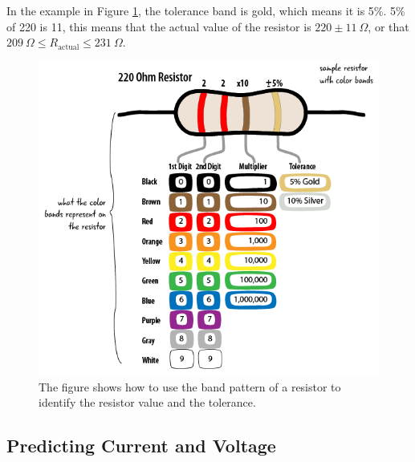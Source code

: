 \documentclass[12pt]{article}
\begin{document}
	In the example in Figure \ref{resistor-chart}, the tolerance band is gold, which means it is 5\%. 5\% of 220 is 11, this means that the actual value of the resistor is $220\pm 11\ \Omega$, or that $209\ \Omega\leq R_\mathrm{actual}\leq 231\ \Omega$.
	\begin{figure}[htb!]
		\centering
		\includegraphics[width=.7\textwidth]{app-a-resistor-chart.png}
		\caption{The figure shows how to use the band pattern of a resistor to identify the resistor value and the tolerance.}
		\label{resistor-chart}
	\end{figure}
	\subsection*{Predicting Current and Voltage}
	\label{predict}
\end{document}
